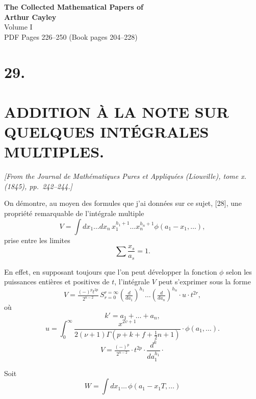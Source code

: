 \documentclass[11pt]{article}
\begin{document}
\begin{center}
{\LARGE\bfseries The Collected Mathematical Papers of}\\[0.5em]
{\LARGE\bfseries Arthur Cayley}\\[1em]
{\Large Volume I}\\[1em]
{\large PDF Pages 226--250 \quad (Book pages 204--228)}\\[2em]
\end{center}

\tableofcontents
\newpage

\section*{29.}
\section*{ADDITION \`A LA NOTE SUR QUELQUES INT\'EGRALES MULTIPLES.}

\textit{[From the Journal de Math\'ematiques Pures et Appliqu\'ees (Liouville), tome x. (1845), pp.~242--244.]}

\bigskip
{}
\setcounter{page}{204}

On d\'emontre, au moyen des formules que j'ai donn\'ees sur ce sujet, [28], une propri\'et\'e remarquable de l'int\'egrale multiple
\[
V = \int dx_1 \ldots dx_n\, x_1^{h_1+1} \ldots x_n^{h_n+1} \phi(a_1 - x_1, \ldots),
\]
prise entre les limites
\[
\sum \frac{x_s}{a_s} = 1.
\]

En effet, en supposant toujours que l'on peut d\'evelopper la fonction $\phi$ selon les puissances enti\`eres et positives de $t$, l'int\'egrale $V$ peut s'exprimer sous la forme
\[
V = \tfrac{(-)^p t^{2p}}{2^{n-2}} \, S^{r=\infty}_{r=0}\!\left( \tfrac{d}{da_1}\right)^{\!h_1} \!\!\ldots \left( \tfrac{d}{da_n}\right)^{\!h_n}\!\!\cdot u \cdot t^{2r},
\]
o\`u
\[
k' = a_1 + \ldots + a_n,
\]
\[
u = \int_0^\infty \frac{x^{2v+1}}{2(\nu+1)\Gamma(p+k+f+\tfrac12 n+1)} \cdot \phi(a_1, \ldots).
\]
\[
V = \tfrac{(-)^p}{2^{n-2}} \cdot t^{2p} \cdot \frac{d^k}{da_1^{h_1}}\cdot
\]

Soit
\[
W = \int dx_1 \ldots\, \phi(a_1 - x_1 T, \ldots)
\]
\end{document}
